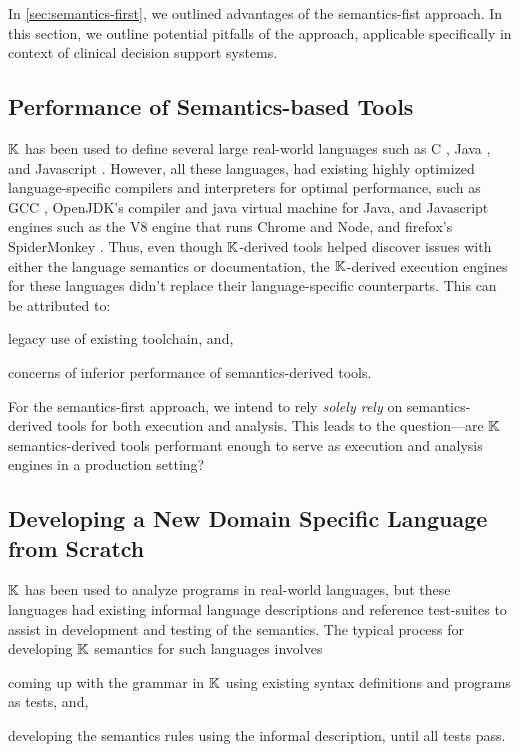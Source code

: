 In \autoref{sec:semantics-first}, we outlined advantages of the
semantics-fist approach.
In this section, we outline potential pitfalls of the
approach, applicable specifically in context of clinical decision support
systems.

\subsection{Performance of Semantics-based Tools}

$\mathbb{K}$ has been used to define several large real-world languages such as C
\cite{HathhornPLDI15}, Java \cite{BogdanasPOPL15}, and Javascript
\cite{ParkPLDI15}. However, all these languages, had existing
highly optimized language-specific compilers and interpreters
for optimal performance, such as GCC \cite{GCCUrl}, OpenJDK's compiler and java
virtual machine for Java, and Javascript engines such as the V8 engine
\cite{V8Url} that runs Chrome and Node, and firefox's SpiderMonkey
\cite{SpiderMonkeyUrl}. Thus, even though $\mathbb{K}$-derived tools helped
discover issues with either the language semantics or documentation,
the $\mathbb{K}$-derived execution engines for these languages didn't
replace their language-specific counterparts. This can be attributed to:
\begin{enumerate*}[label=(\roman*)]
  \item legacy use of existing toolchain, and,
  \item concerns of inferior performance of semantics-derived tools.
\end{enumerate*}

For the semantics-first approach, we intend to rely \emph{solely rely} on
semantics-derived tools for both execution and analysis. This leads to the
question---are $\mathbb{K}$ semantics-derived tools performant enough to serve as
execution and analysis engines in a production setting?

\subsection{Developing a New Domain Specific Language from Scratch}

$\mathbb{K}{}$ has been used to analyze programs in real-world languages, but
these languages had existing informal language descriptions
and reference test-suites to assist in development and testing of
the semantics. The typical process for developing $\mathbb{K}$ semantics for
such languages involves
\begin{enumerate*}[label=(\roman*)]
  \item coming up with the grammar in $\mathbb{K}$ using existing syntax
    definitions and programs as tests, and,
  \item developing the semantics rules using the informal description,
    until all tests pass.
\end{enumerate*}

